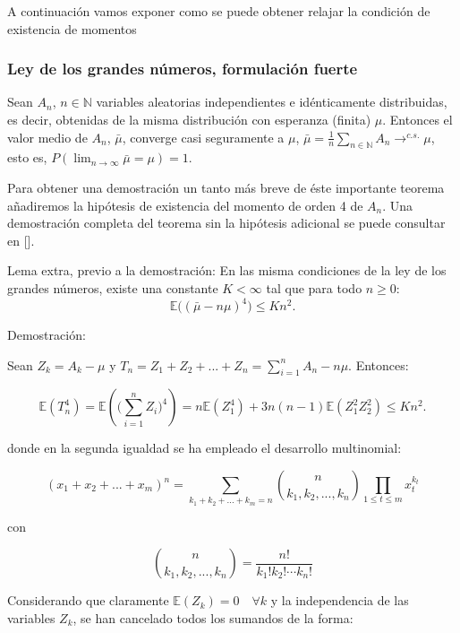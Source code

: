 \documentclass[../proyecto.tex]{memoir}
\begin{document}
A continuación vamos exponer como se puede obtener relajar la condición de existencia de momentos



\subsubsection{Ley de los grandes números, formulación fuerte}

Sean $A_n$, $n \in \mathds{N}$ variables aleatorias independientes e idénticamente distribuidas, es decir, obtenidas de la misma distribución con esperanza (finita) $\mu$. Entonces el valor medio de $A_n$, $\bar{\mu}$, converge casi seguramente a $\mu$, $\bar{\mu}=\frac{1}{n}\sum_{n\in\mathds{N}} A_n \to^{c.s.} \mu$, esto es, $P(\lim_{n\to\infty} \bar{\mu}=\mu) = 1$.

Para obtener una demostración un tanto más breve de éste importante teorema añadiremos la hipótesis de existencia del momento de orden 4 de $A_n$. Una demostración completa del teorema sin la hipótesis adicional se puede consultar en [].

Lema extra, previo a la demostración:
En las misma condiciones de la ley de los grandes números, existe una constante $ K < \infty $ tal que para todo $ n \geq 0$:
$$
	\mathds{E} \big( ( \bar{ \mu } - n \mu ) ^ 4 \big) \leq K n^2.
$$

Demostración:

Sean $Z_k = A_k - \mu $ y $T_n = Z_1 + Z_2 + ... + Z_n = \sum_{i=1}^{n} A_n - n\mu $. Entonces:

$$
	\mathds{E} ( T_{n}^{4} ) = \mathds{E} ( \big( \sum_{i=1}^{n} Z_i \big) ^{4} ) = n\mathds{E}(Z_{1}^4)+3n(n-1)\mathds{E}(Z_1^2 Z_2^2) \leq Kn^2.
$$

donde en la segunda igualdad se ha empleado el desarrollo multinomial:

$$
(x_1+x_2+...+x_m)^n = \sum_{k_1+k_2+...+k_m=n} { n \choose k_1,k_2, ..., k_n} \prod_{1 \leq t \leq m} x_t^{k_t}
$$

con

$$
{ n \choose k_1,k_2, ..., k_n} = \frac{n!}{k_1!k_2! \dotsb k_n!}
$$

Considerando que claramente $\mathds{E}(Z_k)=0 \quad \forall k$ y la independencia de las variables $Z_k$, se han cancelado todos los sumandos de la forma:
\end{document}
